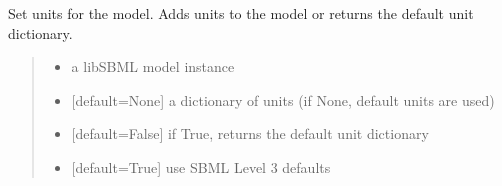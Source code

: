 \documentclass[letterpaper,12pt,english]{sphinxmanual}
\begin{document}

\begin{fulllineitems}
\label{\detokenize{api/io:cbmpy.CBXML.sbml_setUnits}}
\pysigstartsignatures
\pysiglinewithargsret
{}
{\sphinxparamcomma {}\sphinxparamcomma {}\sphinxparamcomma {}}
{}
\pysigstopsignatures
\sphinxAtStartPar
Set units for the model. Adds units to the model or returns the default unit dictionary.
\begin{quote}\begin{description}
\begin{itemize}
\item {} 
\sphinxAtStartPar
{} \textendash{} a libSBML model instance

\item {} 
\sphinxAtStartPar
{} \textendash{} {[}default=None{]} a dictionary of units (if None, default units are used)

\item {} 
\sphinxAtStartPar
{} \textendash{} {[}default=False{]} if True, returns the default unit dictionary

\item {} 
\sphinxAtStartPar
{} \textendash{} {[}default=True{]} use SBML Level 3 defaults

\end{itemize}

\sphinxAtStartPar
{}

\end{description}\end{quote}

\end{fulllineitems}

\end{document}
